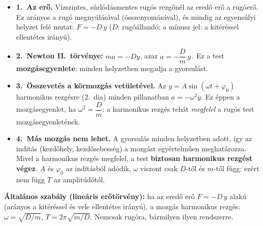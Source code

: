 \documentclass[12pt]{article}
\begin{document}
\begin{minipage}[t]{0.57\linewidth}\vspace{0pt}
\begin{itemize}
  \item \textbf{1.\ Az erő.} Vízszintes, súrlódásmentes rugós rezgőnél az eredő erő a
    rugóerő. Ez arányos a rugó megnyúlásával (összenyomásával), és mindig az egyensúlyi
    helyzet felé mutat: \;$F = -D\,y$ \;($D$: rugóállandó; a mínusz jel: a kitéréssel
    ellentétes irányú).
  \item \textbf{2.\ Newton II.\ törvénye:} \;$ma = -Dy$, \;azaz\;
    $\boxed{a = -\dfrac{D}{m}\,y}$\,. \;Ez a test \textbf{mozgásegyenlete}: minden helyzetben
    megadja a gyorsulást.
  \item \textbf{3.\ Összevetés a körmozgás vetületével.} Az $y = A\sin(\omega t + \varphi_0)$
    harmonikus rezgésre (2.\ dia) minden pillanatban $a = -\omega^2 y$. Ez éppen a
    mozgásegyenlet, ha $\omega^2 = \dfrac{D}{m}$: a harmonikus rezgés tehát
    \emph{megfelel} a rugós test mozgásegyenletének.
  \item \textbf{4.\ Más mozgás nem lehet.} A gyorsulás minden helyzetben adott, így az
    indítás (kezdőhely, kezdősebesség) a mozgást egyértelműen meghatározza. Mivel a harmonikus
    rezgés megfelel, a test \textbf{biztosan harmonikus rezgést végez}. $A$ és $\varphi_0$ az
    indításból adódik, $\omega$ viszont csak $D$-től és $m$-től függ: ezért nem függ $T$ az
    amplitúdótól.
\end{itemize}
\begin{fontos}
\textbf{Általános szabály (lineáris erőtörvény):} ha az eredő erő $F = -D\,y$ alakú
(arányos a kitéréssel és vele ellentétes irányú), a mozgás harmonikus rezgés:
\;$\omega = \sqrt{D/m}$, \;$T = 2\pi\sqrt{m/D}$. \;Nemcsak rugóra, bármilyen ilyen rendszerre.
\end{fontos}
\end{minipage}\hfill
\end{document}
